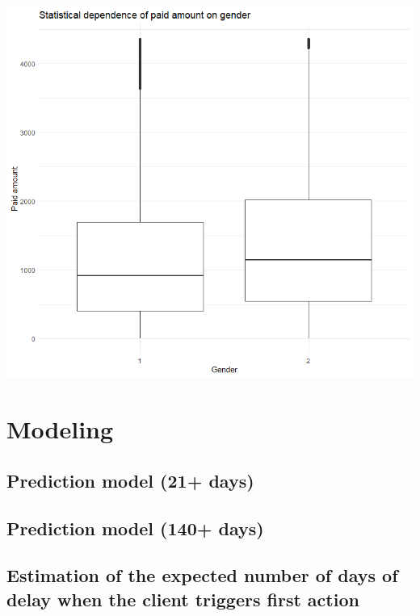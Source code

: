 \documentclass[
]{article}
\begin{document}
\includegraphics{Statistical dependence of paid amount on gender.png}

\hypertarget{modeling}{%
\section{Modeling}\label{modeling}}

\hypertarget{prediction-model-21-days}{%
\subsection{Prediction model (21+ days)}\label{prediction-model-21-days}}

\hypertarget{prediction-model-140-days}{%
\subsection{Prediction model (140+ days)}\label{prediction-model-140-days}}

\hypertarget{estimation-of-the-expected-number-of-days-of-delay-when-the-client-triggers-first-action}{%
\subsection{Estimation of the expected number of days of delay when the client triggers first action}\label{estimation-of-the-expected-number-of-days-of-delay-when-the-client-triggers-first-action}}
\end{document}
